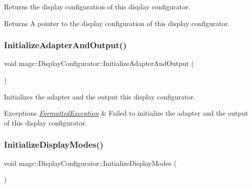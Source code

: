 Returns the display configuration of this display configurator.

\begin{DoxyReturn}{Returns}
A pointer to the display configuration of this display configurator. 
\end{DoxyReturn}
\hypertarget{classmage_1_1_display_configurator_a03fd2c38f6fdb6fbc8ff429a7d0d2a89}{}\label{classmage_1_1_display_configurator_a03fd2c38f6fdb6fbc8ff429a7d0d2a89} 
\subsubsection{\texorpdfstring{Initialize\+Adapter\+And\+Output()}{InitializeAdapterAndOutput()}}
{\footnotesize\ttfamily void mage\+::\+Display\+Configurator\+::\+Initialize\+Adapter\+And\+Output (\begin{DoxyParamCaption}{ }\end{DoxyParamCaption})\hspace{0.3cm}{\ttfamily [private]}}

Initializes the adapter and the output this display configurator.


\begin{DoxyExceptions}{Exceptions}
{\em \hyperlink{classmage_1_1_formatted_exception}{Formatted\+Exception}} & Failed to initialize the adapter and the output of this display configurator. \\
\hline
\end{DoxyExceptions}
\hypertarget{classmage_1_1_display_configurator_a90ecffb8d93768464bb1698531a34db7}{}\label{classmage_1_1_display_configurator_a90ecffb8d93768464bb1698531a34db7} 
\subsubsection{\texorpdfstring{Initialize\+Display\+Modes()}{InitializeDisplayModes()}}
{\footnotesize\ttfamily void mage\+::\+Display\+Configurator\+::\+Initialize\+Display\+Modes (\begin{DoxyParamCaption}{ }\end{DoxyParamCaption})\hspace{0.3cm}{\ttfamily [private]}}

